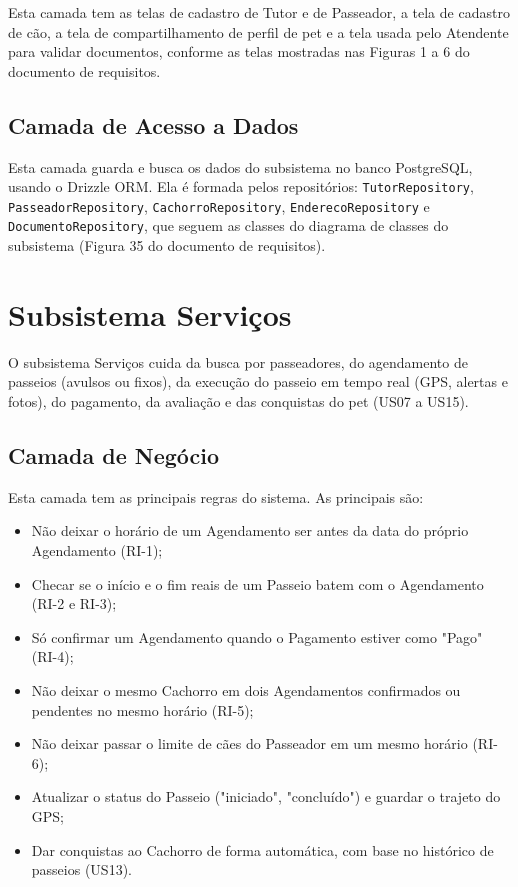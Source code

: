 Esta camada tem as telas de cadastro de Tutor e de Passeador, a tela de cadastro de cão, a tela de compartilhamento de perfil de pet e a tela usada pelo Atendente para validar documentos, conforme as telas mostradas nas Figuras 1 a 6 do documento de requisitos.


\subsection{Camada de Acesso a Dados}
\label{sec-componentes-perfis-dados}

Esta camada guarda e busca os dados do subsistema no banco PostgreSQL, usando o Drizzle ORM. Ela é formada pelos repositórios: \texttt{TutorRepository}, \texttt{PasseadorRepository}, \texttt{CachorroRepository}, \texttt{EnderecoRepository} e \texttt{DocumentoRepository}, que seguem as classes do diagrama de classes do subsistema (Figura 35 do documento de requisitos).



\section{Subsistema Serviços}
\label{sec-componentes-servicos}

O subsistema Serviços cuida da busca por passeadores, do agendamento de passeios (avulsos ou fixos), da execução do passeio em tempo real (GPS, alertas e fotos), do pagamento, da avaliação e das conquistas do pet (US07 a US15).


\subsection{Camada de Negócio}
\label{sec-componentes-servicos-negocio}

Esta camada tem as principais regras do sistema. As principais são:

\begin{itemize}
	\item Não deixar o horário de um Agendamento ser antes da data do próprio Agendamento (RI-1);
	\item Checar se o início e o fim reais de um Passeio batem com o Agendamento (RI-2 e RI-3);
	\item Só confirmar um Agendamento quando o Pagamento estiver como "Pago" (RI-4);
	\item Não deixar o mesmo Cachorro em dois Agendamentos confirmados ou pendentes no mesmo horário (RI-5);
	\item Não deixar passar o limite de cães do Passeador em um mesmo horário (RI-6);
	\item Atualizar o status do Passeio ("iniciado", "concluído") e guardar o trajeto do GPS;
	\item Dar conquistas ao Cachorro de forma automática, com base no histórico de passeios (US13).
\end{itemize}


